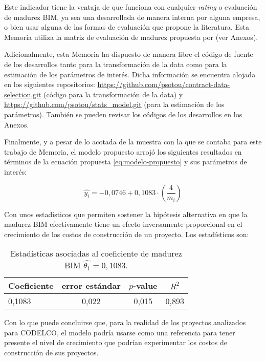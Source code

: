 Este indicador tiene la ventaja de que funciona con cualquier \emph{rating} o evaluación de madurez BIM, ya sea una desarrollada de manera interna por alguna empresa, o bien usar alguna de las formas de evaluación que propone la literatura. Esta Memoria utiliza la matriz de evaluación de madurez propuesta por  (ver Anexos).

Adicionalmente, esta Memoria ha dispuesto de manera libre el código de fuente de los desarrollos tanto para la transformación de la data como para la estimación de los parámetros de interés. Dicha información se encuentra alojada en los siguientes repositorios: \url{https://github.com/psotou/contract-data-selection.git} (código para la transformación de la data) y \url{https://github.com/psotou/stats_model.git} (para la estimación de los parámetros). También se pueden revisar los códigos de los desarrollos en los Anexos.

Finalmente, y a pesar de lo acotada de la muestra con la que se contaba para este trabajo de Memoria, el modelo propuesto arrojó los siguientes resultados en términos de la ecuación propuesta \eqref{eq:modelo-propuesto} y sus parámetros de interés:

\begin{equation*}
    \hat{y_i} = -0,0746 + 0,1083\cdot \left( \frac{4}{m_i} \right)
\end{equation*}

Con unos estadísticos que permiten sostener la hipótesis alternativa en que la madurez BIM efectivamente tiene un efecto inversamente proporcional en el crecimiento de los costos de construcción de un proyecto. Los estadísticos son:

\begin{table}[H]
    \centering
    \caption{Estadísticas asociadas al coeficiente de madurez BIM $\hat{\theta_1} = 0,1083$.}
    \begin{tabular}{lccc}
        \toprule
        Coeficiente & error estándar & $p$-value & $R^2$\\
        \midrule
        0,1083      & 0,022          & 0,015     & 0,893\\  
        \bottomrule        
    \end{tabular}
\end{table}

Con lo que puede concluirse que, para la realidad de los proyectos analizados para CODELCO, el modelo podría usarse como una referencia para tener presente el nivel de crecimiento que podrían experimentar los costos de construcción de sus proyectos.
